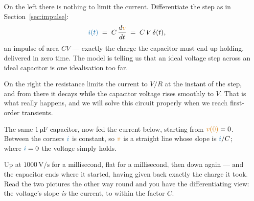 \documentclass[11pt,a4paper]{article}
\newcommand{\Icol}[1]{\textcolor{ccur}{#1}}
\newcommand{\Vcol}[1]{\textcolor{cvolt}{#1}}
\newcommand{\uni}[1]{\,\mathrm{#1}}
\newcommand{\taxes}[4]{%
  \draw[vax] (-0.15,0) -- (#1,0) node[right=1pt, font=\scriptsize] {$t$};
  \draw[vax] (0,-#2) -- (0,#3) node[above=1pt, font=\scriptsize] {#4};}
\begin{document}
\begin{examplebox}
On the left there is nothing to limit the current. Differentiate the step as in
Section~\ref{sec:impulse}:
\[
  \Icol{i(t)} \;=\; C\,\frac{d\Vcol{v}}{dt} \;=\; C\,V\,\delta(t) ,
\]
an impulse of area $CV$ --- exactly the charge the capacitor must end up holding, delivered
in zero time. The model is telling us that an ideal voltage step across an ideal capacitor
is one idealisation too far.
\vspace{3pt}

On the right the resistance limits the current to $V/R$ at the instant of the step, and
from there it decays while the capacitor voltage rises smoothly to $V$. That is what really
happens, and we will solve this circuit properly when we reach first-order transients.
\end{examplebox}

\begin{examplebox}
The same $1\uni{\mu F}$ capacitor, now fed the current below, starting from
$\Vcol{v(0)} = 0$. Between the corners $\Icol{i}$ is constant, so $\Vcol{v}$ is a straight
line whose slope is $\Icol{i}/C$; where $\Icol{i} = 0$ the voltage simply holds.

\begin{center}
\end{center}
\vspace{-2pt}
Up at $1000\uni{V/s}$ for a millisecond, flat for a millisecond, then down again --- and
the capacitor ends where it started, having given back exactly the charge it took. Read
the two pictures the other way round and you have the differentiating view: the voltage's
slope \emph{is} the current, to within the factor $C$.
\end{examplebox}
\end{document}
